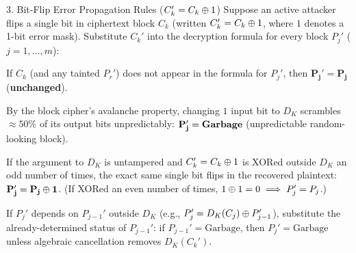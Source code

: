 \begin{summarybox}{3. Bit-Flip Error Propagation Rules ($C_k' = C_k \oplus 1$)}
Suppose an active attacker flips a single bit in ciphertext block $C_k$ (written $C_k' = C_k \oplus 1$, where $1$ denotes a 1-bit error mask). Substitute $C_k'$ into the decryption formula for every block $P_j'$ ($j = 1, \dots, m$):
\begin{compactitem}
  \item {} If $C_k$ (and any tainted $P_r'$) does not appear in the formula for $P_j'$, then $\mathbf{P_j' = P_j}$ (\textbf{unchanged}).
  \item {} By the block cipher's avalanche property, changing $1$ input bit to $D_K$ scrambles $\approx 50\%$ of its output bits unpredictably: $\mathbf{P_j' = \text{\textbf{Garbage}}}$ (unpredictable random-looking block).
  \item {} If the argument to $D_K$ is untampered and $C_k' = C_k \oplus 1$ is XORed outside $D_K$ an odd number of times, the exact same single bit flips in the recovered plaintext: $\mathbf{P_j' = P_j \oplus 1}$. (If XORed an even number of times, $1 \oplus 1 = 0 \implies P_j' = P_j$.)
  \item {} If $P_j'$ depends on $P_{j-1}'$ outside $D_K$ (e.g., $P_j' = D_K(C_j) \oplus P_{j-1}'$), substitute the already-determined status of $P_{j-1}'$: if $P_{j-1}' = \text{Garbage}$, then $P_j' = \text{Garbage}$ unless algebraic cancellation removes $D_K(C_k')$.
\end{compactitem}
\end{summarybox}

